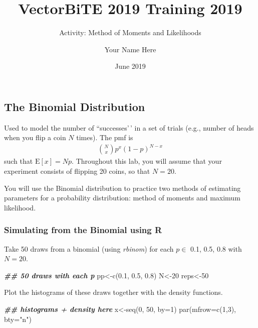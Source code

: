 \documentclass[
]{article}
\title{VectorBiTE 2019 Training 2019}
\subtitle{Activity: Method of Moments and Likelihoods}
\author{Your Name Here}
\date{June 2019}
\newenvironment{Shaded}{\begin{snugshade}}{\end{snugshade}}
\newcommand{\AttributeTok}[1]{\textcolor[rgb]{0.77,0.63,0.00}{#1}}
\newcommand{\DecValTok}[1]{\textcolor[rgb]{0.00,0.00,0.81}{#1}}
\newcommand{\DocumentationTok}[1]{\textcolor[rgb]{0.56,0.35,0.01}{\textbf{\textit{#1}}}}
\newcommand{\FloatTok}[1]{\textcolor[rgb]{0.00,0.00,0.81}{#1}}
\newcommand{\FunctionTok}[1]{\textcolor[rgb]{0.00,0.00,0.00}{#1}}
\newcommand{\NormalTok}[1]{#1}
\newcommand{\OtherTok}[1]{\textcolor[rgb]{0.56,0.35,0.01}{#1}}
\newcommand{\StringTok}[1]{\textcolor[rgb]{0.31,0.60,0.02}{#1}}
\begin{document}
\maketitle

\hypertarget{the-binomial-distribution}{%
\subsection{The Binomial Distribution}\label{the-binomial-distribution}}

Used to model the number of ``successes'\,' in a set of trials (e.g.,
number of heads when you flip a coin \(N\) times). The pmf is
\begin{align*}
{N \choose x} p^x(1-p)^{N-x}
\end{align*} such that \(\mathrm{E}[x]=Np\). Throughout this lab, you
will assume that your experiment consists of flipping 20 coins, so that
\(N=20\).

You will use the Binomial distribution to practice two methods of
estimating parameters for a probability distribution: method of moments
and maximum likelihood.

\hypertarget{simulating-from-the-binomial-using-r}{%
\subsubsection{Simulating from the Binomial using
R}\label{simulating-from-the-binomial-using-r}}

Take 50 draws from a binomial (using \emph{rbinom}) for each \(p\in\)
0.1, 0.5, 0.8 with \(N=20\).

\begin{Shaded}
\begin{Highlighting}[]
\DocumentationTok{\#\# 50 draws with each p }
\NormalTok{pp}\OtherTok{\textless{}{-}}\FunctionTok{c}\NormalTok{(}\FloatTok{0.1}\NormalTok{, }\FloatTok{0.5}\NormalTok{, }\FloatTok{0.8}\NormalTok{)}
\NormalTok{N}\OtherTok{\textless{}{-}}\DecValTok{20}
\NormalTok{reps}\OtherTok{\textless{}{-}}\DecValTok{50}
\end{Highlighting}
\end{Shaded}

Plot the histograms of these draws together with the density functions.

\begin{Shaded}
\begin{Highlighting}[]
\DocumentationTok{\#\# histograms + density here}
\NormalTok{x}\OtherTok{\textless{}{-}}\FunctionTok{seq}\NormalTok{(}\DecValTok{0}\NormalTok{, }\DecValTok{50}\NormalTok{, }\AttributeTok{by=}\DecValTok{1}\NormalTok{)}
\FunctionTok{par}\NormalTok{(}\AttributeTok{mfrow=}\FunctionTok{c}\NormalTok{(}\DecValTok{1}\NormalTok{,}\DecValTok{3}\NormalTok{), }\AttributeTok{bty=}\StringTok{"n"}\NormalTok{)}
\end{Highlighting}
\end{Shaded}
\end{document}
